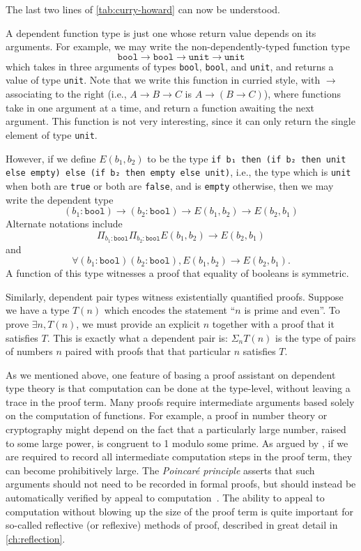 The last two lines of \autoref{tab:curry-howard} can now be understood.

A dependent function type is just one whose return value depends on its arguments.
For example, we may write the non-dependently-typed function type
\[
\texttt{bool} \to \texttt{bool} \to \texttt{unit} \to \texttt{unit}
\]
which takes in three arguments of types \texttt{bool}, \texttt{bool}, and \texttt{unit}, and returns a value of type \texttt{unit}.
Note that we write this function in curried style, with $\to$ associating to the right (i.e., $A \to B \to C$ is $A \to (B \to C)$), where functions take in one argument at a time, and return a function awaiting the next argument.
This function is not very interesting, since it can only return the single element of type \texttt{unit}.

However, if we define $E(b_1, b_2)$ to be the type \texttt{if b₁ then (if b₂ then unit else empty) else (if b₂ then empty else unit)}, i.e., the type which is \texttt{unit} when both are \texttt{true} or both are \texttt{false}, and is \texttt{empty} otherwise, then we may write the dependent type
\[
(b_1 : \texttt{bool}) \to (b_2 : \texttt{bool}) \to E(b_1, b_2) \to E(b_2, b_1)
\]
Alternate notations include
\[
\Pi_{b_1 : \texttt{bool}} \Pi_{b_2 : \texttt{bool}} E(b_1, b_2) \to E(b_2, b_1)
\]
and
\[
\forall (b_1 : \texttt{bool}) (b_2 : \texttt{bool}), E(b_1, b_2) \to E(b_2, b_1).
\]
A function of this type witnesses a proof that equality of booleans is symmetric.

Similarly, dependent pair types witness existentially quantified proofs.
Suppose we have a type $T(n)$ which encodes the statement ``$n$ is prime and even''.
To prove $\exists n, T(n)$, we must provide an explicit $n$ together with a proof that it satisfies $T$.
This is exactly what a dependent pair is: $\Sigma_n T(n)$ is the type of pairs of numbers $n$ paired with proofs that that particular $n$ satisfies $T$.


As we mentioned above, one feature of basing a proof assistant on dependent type theory is that computation can be done at the type-level, without leaving a trace in the proof term.
Many proofs require intermediate arguments based solely on the computation of functions.
For example, a proof in number theory or cryptography might depend on the fact that a particularly large number, raised to some large power, is congruent to 1 modulo some prime.
As argued by \textcite{stampoulis2013veriml}, if we are required to record all intermediate computation steps in the proof term, they can become prohibitively large.
The \emph{Poincaré principle} asserts that such arguments should not need to be recorded in formal proofs, but should instead be automatically verified by appeal to computation~\cite[p.~1167]{barendregt2001proof}.
The ability to appeal to computation without blowing up the size of the proof term is quite important for so-called reflective (or reflexive) methods of proof, described in great detail in \autoref{ch:reflection}.

